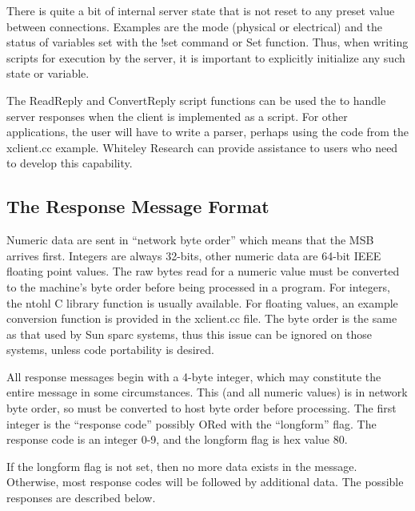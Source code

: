 There is quite a bit of internal server state that is not reset to any
preset value between connections.  Examples are the mode (physical or
electrical) and the status of variables set with the {\cb !set}
command or {\vt Set} function.  Thus, when writing scripts for
execution by the server, it is important to explicitly initialize any
such state or variable.

The {\vt ReadReply} and {\vt ConvertReply} script functions can be
used the to handle server responses when the client is implemented as
a script.  For other applications, the user will have to write a
parser, perhaps using the code from the {\vt xclient.cc} example. 
Whiteley Research can provide assistance to users who need to develop
this capability.

\subsection{The Response Message Format}

Numeric data are sent in ``network byte order'' which means that the
MSB arrives first.  Integers are always 32-bits, other numeric data
are 64-bit IEEE floating point values.  The raw bytes read for a
numeric value must be converted to the machine's byte order before
being processed in a program.  For integers, the {\vt ntohl} C library
function is usually available.  For floating values, an example
conversion function is provided in the {\vt xclient.cc} file.  The
byte order is the same as that used by Sun sparc systems, thus this
issue can be ignored on those systems, unless code portability is
desired.

All response messages begin with a 4-byte integer, which may
constitute the entire message in some circumstances.  This (and all
numeric values) is in network byte order, so must be converted to host
byte order before processing.  The first integer is the ``response
code'' possibly ORed with the ``longform'' flag.  The response code is
an integer 0-9, and the longform flag is hex value 80.

If the longform flag is not set, then no more data exists in the
message.  Otherwise, most response codes will be followed by
additional data.  The possible responses are described below.

